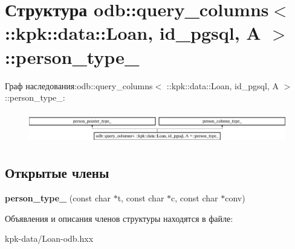 \hypertarget{structodb_1_1query__columns_3_01_1_1kpk_1_1data_1_1_loan_00_01id__pgsql_00_01_a_01_4_1_1person__type__}{}\section{Структура odb\+:\+:query\+\_\+columns$<$ \+:\+:kpk\+:\+:data\+:\+:Loan, id\+\_\+pgsql, A $>$\+:\+:person\+\_\+type\+\_\+}
\label{structodb_1_1query__columns_3_01_1_1kpk_1_1data_1_1_loan_00_01id__pgsql_00_01_a_01_4_1_1person__type__}
Граф наследования\+:odb\+:\+:query\+\_\+columns$<$ \+:\+:kpk\+:\+:data\+:\+:Loan, id\+\_\+pgsql, A $>$\+:\+:person\+\_\+type\+\_\+\+:\begin{figure}[H]
\begin{center}
\leavevmode
\includegraphics[height=1.396509cm]{structodb_1_1query__columns_3_01_1_1kpk_1_1data_1_1_loan_00_01id__pgsql_00_01_a_01_4_1_1person__type__}
\end{center}
\end{figure}
\subsection*{Открытые члены}
\begin{DoxyCompactItemize}
\item 
{\bfseries person\+\_\+type\+\_\+} (const char $\ast$t, const char $\ast$c, const char $\ast$conv)\hypertarget{structodb_1_1query__columns_3_01_1_1kpk_1_1data_1_1_loan_00_01id__pgsql_00_01_a_01_4_1_1person__type___ab37f4086bf052ab33bd22affe874528d}{}\label{structodb_1_1query__columns_3_01_1_1kpk_1_1data_1_1_loan_00_01id__pgsql_00_01_a_01_4_1_1person__type___ab37f4086bf052ab33bd22affe874528d}

\end{DoxyCompactItemize}


Объявления и описания членов структуры находятся в файле\+:\begin{DoxyCompactItemize}
\item 
kpk-\/data/Loan-\/odb.\+hxx\end{DoxyCompactItemize}
